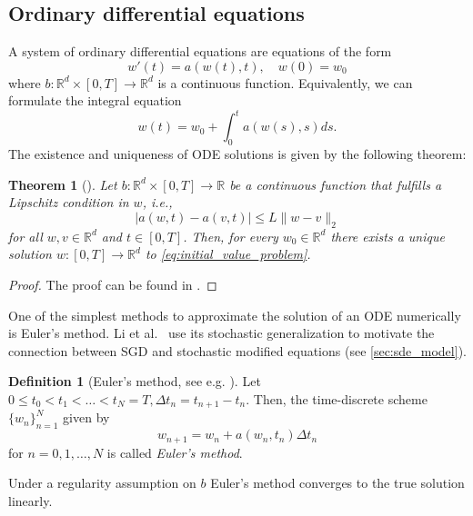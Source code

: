 \documentclass[12pt]{article}
\newtheorem{theorem}{Theorem}[section]
\theoremstyle{definition}
\newtheorem{definition}[definition]{Definition}
\numberwithin{equation}{section}
\newcommand{\R}{\mathbb{R}}
\newcommand{\norm}[1]{\lVert{#1}\rVert_2}
\begin{document}
\subsection{Ordinary differential equations}
A system of ordinary differential equations are equations of the form
\begin{equation}
  \label{eq:initial_value_problem}
  w'(t) = a(w(t),t), \quad w(0) = w_0
\end{equation}
where $b : \R^d \times [0,T] \rightarrow \R^d$ is a continuous function. Equivalently, we can formulate the integral equation
\begin{equation}
  w(t) = w_0 + \int_0^t a(w(s),s)ds.
\end{equation}
The existence and uniqueness of ODE solutions is given by the following theorem:
\begin{theorem}[]
  Let $b : \R^d \times [0,T] \rightarrow \R$ be a continuous function that fulfills a Lipschitz condition in $w$, i.e.,
  \begin{equation*}
    \lvert a(w,t) - a(v,t) \rvert \leq L \norm{w - v}
  \end{equation*}
  for all $w,v \in \R^d$ and $t \in [0,T]$. Then, for every $w_0 \in \R^d$ there exists a unique solution $w:[0,T] \rightarrow \R^d$ to \eqref{eq:initial_value_problem}.
\end{theorem}
\begin{proof}
  The proof can be found in .
\end{proof}
One of the simplest methods to approximate the solution of an ODE numerically is Euler's method. Li et al.\ \cite{liStochasticModifiedEquations2019} use its stochastic generalization to motivate the connection between SGD and stochastic modified equations (see \autoref{sec:sde_model}).
\begin{definition}[Euler's method, see e.g. ]
  Let $0 \leq t_0 < t_1 < \dots < t_N = T, \Delta t_n = t_{n+1} - t_n$. Then, the time-discrete scheme $\{w_n\}_{n=1}^N$ given by
  \begin{equation}
    \label{eq:ode_euler}
    w_{n+1} = w_n + a(w_n, t_n) \Delta t_n
  \end{equation}
  for $n=0,1,\dots,N$ is called \emph{Euler's method}.
\end{definition}
Under a regularity assumption on $b$ Euler's method converges to the true solution linearly.
\end{document}
